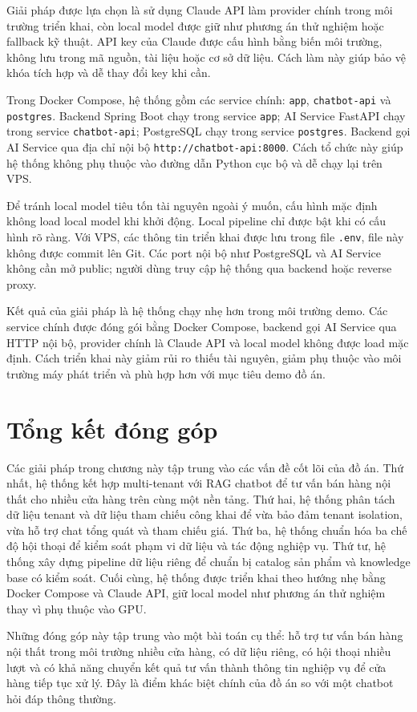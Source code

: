 \documentclass[../DoAn.tex]{subfiles}
\begin{document}
Giải pháp được lựa chọn là sử dụng Claude API làm provider chính trong môi trường triển khai, còn local model được giữ như phương án thử nghiệm hoặc fallback kỹ thuật. API key của Claude được cấu hình bằng biến môi trường, không lưu trong mã nguồn, tài liệu hoặc cơ sở dữ liệu. Cách làm này giúp bảo vệ khóa tích hợp và dễ thay đổi key khi cần.

Trong Docker Compose, hệ thống gồm các service chính: \texttt{app}, \texttt{chatbot-api} và \texttt{postgres}. Backend Spring Boot chạy trong service \texttt{app}; AI Service FastAPI chạy trong service \texttt{chatbot-api}; PostgreSQL chạy trong service \texttt{postgres}. Backend gọi AI Service qua địa chỉ nội bộ \texttt{http://chatbot-api:8000}. Cách tổ chức này giúp hệ thống không phụ thuộc vào đường dẫn Python cục bộ và dễ chạy lại trên VPS.

Để tránh local model tiêu tốn tài nguyên ngoài ý muốn, cấu hình mặc định không load local model khi khởi động. Local pipeline chỉ được bật khi có cấu hình rõ ràng. Với VPS, các thông tin triển khai được lưu trong file \texttt{.env}, file này không được commit lên Git. Các port nội bộ như PostgreSQL và AI Service không cần mở public; người dùng truy cập hệ thống qua backend hoặc reverse proxy.

Kết quả của giải pháp là hệ thống chạy nhẹ hơn trong môi trường demo. Các service chính được đóng gói bằng Docker Compose, backend gọi AI Service qua HTTP nội bộ, provider chính là Claude API và local model không được load mặc định. Cách triển khai này giảm rủi ro thiếu tài nguyên, giảm phụ thuộc vào môi trường máy phát triển và phù hợp hơn với mục tiêu demo đồ án.

\section{Tổng kết đóng góp}
\label{section:5.6}

Các giải pháp trong chương này tập trung vào các vấn đề cốt lõi của đồ án. Thứ nhất, hệ thống kết hợp multi-tenant với RAG chatbot để tư vấn bán hàng nội thất cho nhiều cửa hàng trên cùng một nền tảng. Thứ hai, hệ thống phân tách dữ liệu tenant và dữ liệu tham chiếu công khai để vừa bảo đảm tenant isolation, vừa hỗ trợ chat tổng quát và tham chiếu giá. Thứ ba, hệ thống chuẩn hóa ba chế độ hội thoại để kiểm soát phạm vi dữ liệu và tác động nghiệp vụ. Thứ tư, hệ thống xây dựng pipeline dữ liệu riêng để chuẩn bị catalog sản phẩm và knowledge base có kiểm soát. Cuối cùng, hệ thống được triển khai theo hướng nhẹ bằng Docker Compose và Claude API, giữ local model như phương án thử nghiệm thay vì phụ thuộc vào GPU.

Những đóng góp này tập trung vào một bài toán cụ thể: hỗ trợ tư vấn bán hàng nội thất trong môi trường nhiều cửa hàng, có dữ liệu riêng, có hội thoại nhiều lượt và có khả năng chuyển kết quả tư vấn thành thông tin nghiệp vụ để cửa hàng tiếp tục xử lý. Đây là điểm khác biệt chính của đồ án so với một chatbot hỏi đáp thông thường.
\end{document}
